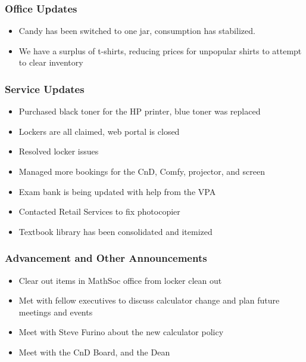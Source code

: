 \subsubsection*{Office Updates}
\begin{itemize}
\item Candy has been switched to one jar, consumption has stabilized. 
\item We have a surplus of t-shirts, reducing prices for unpopular shirts to attempt to clear inventory
\end{itemize}

\subsubsection*{Service Updates}
\begin{itemize}
\item Purchased black toner for the HP printer, blue toner was replaced
\item Lockers are all claimed, web portal is closed
\item Resolved locker issues
\item Managed more bookings for the CnD, Comfy, projector, and screen
\item Exam bank is being updated with help from the VPA
\item Contacted Retail Services to fix photocopier
\item Textbook library has been consolidated and itemized
\end{itemize}

\subsubsection*{Advancement and Other Announcements}
\begin{itemize}
\item Clear out items in MathSoc office from locker clean out
\item Met with fellow executives to discuss calculator change and plan future meetings and events
\item Meet with Steve Furino about the new calculator policy
\item Meet with the CnD Board, and the Dean

\end{itemize}